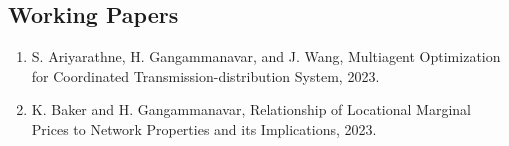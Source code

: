 \documentclass[hyperref, margin]{myResume}
\begin{document}
\begin{resume}
 \section{Working Papers}
\begin{enumerate}[label=W\arabic*., leftmargin=*]
	\item S. Ariyarathne\footnotemark[1], H. Gangammanavar, and J. Wang, Multiagent Optimization for Coordinated Transmission-distribution System, 2023.
	\item K. Baker and H. Gangammanavar, Relationship of Locational Marginal Prices to Network Properties and its Implications, 2023.	
\end{enumerate}


\end{resume}
\end{document}
